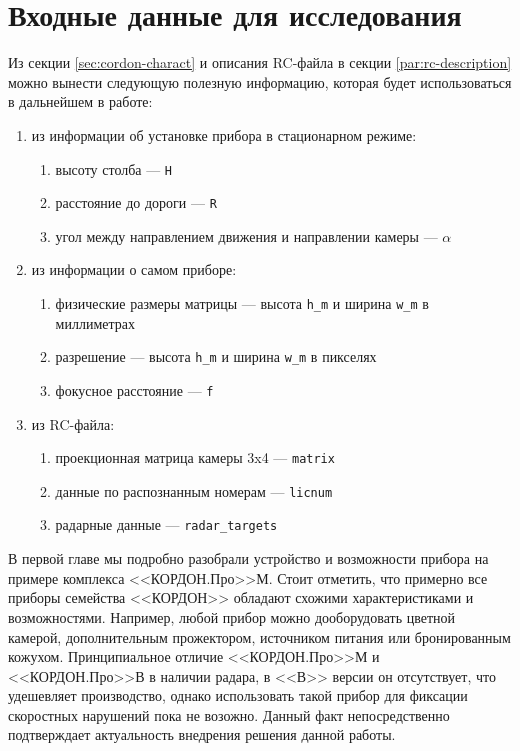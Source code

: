 \documentclass[specification,annotation,times]{itmo-student-thesis}
\begin{document}
\section{Входные данные для исследования}
Из секции \ref{sec:cordon-charact} и описания RC-файла в секции \ref{par:rc-description} можно вынести следующую полезную информацию, которая будет использоваться в дальнейшем в работе:
\begin{enumerate}
	\item из информации об установке прибора в стационарном режиме:
	\begin{enumerate}
		\item высоту столба --- \texttt{H}
		\item расстояние до дороги --- \texttt{R}
		\item угол между направлением движения и направлении камеры --- $ \alpha  $
	\end{enumerate}
	\item из информации о самом приборе:
	\begin{enumerate}
		\item физические размеры матрицы --- высота \texttt{h\_m} и ширина \texttt{w\_m} в миллиметрах
		\item разрешение --- высота \texttt{h\_m} и ширина \texttt{w\_m} в пикселях
		\item фокусное расстояние --- \texttt{f}
	\end{enumerate}
	\item из RC-файла:
	\begin{enumerate}
		\item проекционная матрица камеры 3x4 --- \texttt{matrix}
		\item данные по распознанным номерам --- \texttt{licnum}
		\item радарные данные --- \texttt{radar\_targets}
	\end{enumerate}
\end{enumerate}

\chapterconclusion

В первой главе мы подробно разобрали устройство и возможности прибора на примере комплекса  <<КОРДОН.Про>>М. Стоит отметить, что примерно все приборы семейства <<КОРДОН>> обладают схожими характеристиками и возможностями. Например, любой прибор можно дооборудовать цветной камерой, дополнительным прожектором, источником питания или бронированным кожухом. Принципиальное отличие <<КОРДОН.Про>>М и <<КОРДОН.Про>>В в наличии радара, в <<В>>  версии он отсутствует, что удешевляет производство, однако использовать такой прибор для фиксации скоростных нарушений пока не возожно. Данный факт непосредственно подтверждает актуальность внедрения решения данной работы.
\end{document}
